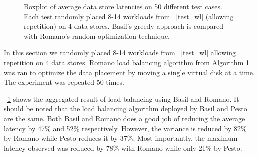 \begin{figure}[!t]
\ContinuedFloat
\centering
{}
\captionsetup{format=myformat}
\caption{Boxplot of average data store latencies on 50 different test cases.
Each test randomly placed 8-14 workloads from \tablename~\ref{test_wl} (allowing repetition) on 4 data stores.
Basil's greedy approach is compared with Romano's random optimization technique.
}
\label{load_bal}
\end{figure}

In this section we randomly placed 8-14 workloads from \tablename~\ref{test_wl} allowing repetition on 4 data stores.
Romano load balancing algorithm from Algorithm 1 was ran to optimize the data placement by moving a single virtual disk at a time.
The experiment was repeated 50 times.

\figurename~\ref{load_bal} shows the aggregated result of load balancing using Basil and Romano.
It should be noted that the load balancing algorithm deployed by Basil and Pesto are the same.
Both Basil and Romano does a good job of reducing the average latency by 47\% and 52\% respectively.
However, the variance is reduced by 82\% by Romano while Pesto reduces it by 37\%.
Most importantly, the maximum latency observed was reduced by 78\% with Romano while only 21\% by Pesto.

